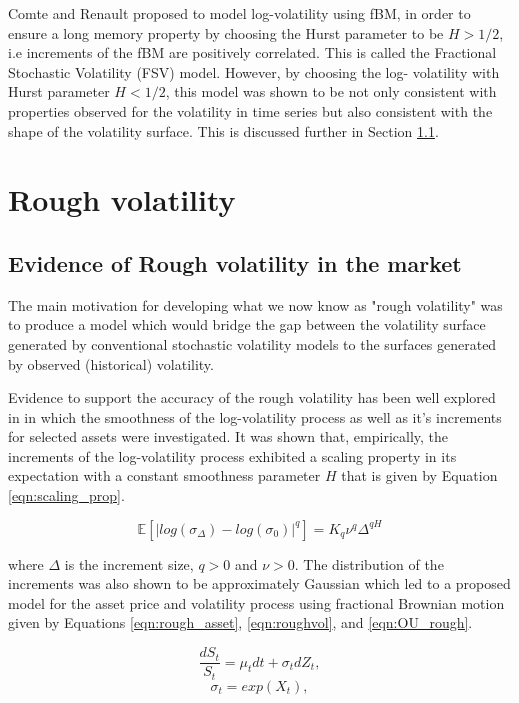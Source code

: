\documentclass[12pt,oneside]{article}
\begin{document}
Comte and Renault \cite{ComteRenault1998} proposed to model log-volatility using fBM, in order to ensure a long memory property by choosing the Hurst parameter to be $H>1/2$, i.e increments of the fBM are positively correlated. This is called the Fractional Stochastic Volatility (FSV) model. However, by choosing the log- volatility with Hurst parameter $H<1/2$, this model was shown to be not only consistent with properties observed for the volatility in time series but also consistent with the shape of the volatility surface. This is discussed further in Section \ref{sec:rough_vol_evidence}.

\section{Rough volatility}
\subsection{Evidence of Rough volatility in the market}
\label{sec:rough_vol_evidence}
The main motivation for developing what we now know as "rough volatility" was to produce a model which would bridge the gap between the volatility surface generated by conventional stochastic volatility models to the surfaces generated by observed (historical) volatility. 

Evidence to support the accuracy of the rough volatility  has been well explored in \cite{gatheral2014volatility} in which the smoothness of the log-volatility process as well as it's increments for selected assets were investigated. It was shown that, empirically, the increments of the log-volatility process exhibited a scaling property in its expectation with a constant smoothness parameter $H$ that is given by Equation \ref{eqn:scaling_prop}.

\begin{equation}
\label{eqn:scaling_prop}
\mathbb{E}[|log(\sigma_\Delta)-log(\sigma_0)|^q]=K_q\nu^q\Delta^{qH}
\end{equation}

where $\Delta$ is the increment size, $q>0$ and $\nu>0$. The distribution of the increments was also shown to be  approximately Gaussian which led to a proposed model for the asset price and volatility process using fractional Brownian motion given by Equations \ref{eqn:rough_asset}, \ref{eqn:roughvol}, and \ref{eqn:OU_rough}.

\begin{equation}
\label{eqn:rough_asset}
 \frac{dS_{t}}{S_{t}} = \mu_{t} dt + \sigma_{t} dZ_{t},
\end{equation}
\begin{equation}
\label{eqn:roughvol}
    \sigma_{t} = exp(X_{t}),
\end{equation}
\end{document}
